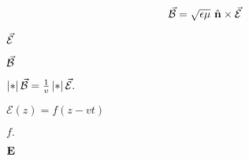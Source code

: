 \documentclass[10pt]{book}
\begin{document}
\begin{mdSnippets}
\begin{mdDisplaySnippet}%
\[%
\vBB = \sqrt{\epsilon\mu}\ \vn \times \vEE
\]%
\end{mdDisplaySnippet}%
\begin{mdInlineSnippet}%
$\vec{\mathcal{E}}$\end{mdInlineSnippet}%
\begin{mdInlineSnippet}[9753da3b8740fe5fb11142e0a6613de8]%
$\vec{\mathcal{B}}$\end{mdInlineSnippet}%
\begin{mdInlineSnippet}[b9ecba80b09dd2783868e27d65c93a93]%
$\left\vert *\right\vert{\vec{\mathcal{B}}} = \frac{1}{v} \left\vert *\right\vert{\vec{\mathcal{E}}}.$\end{mdInlineSnippet}%
\begin{mdInlineSnippet}[b31d5dc945d47925f07107d15157d14f]%
$\mathcal{E}(z) = f(z - vt)$\end{mdInlineSnippet}%
\begin{mdInlineSnippet}[e3cde3f61de01c172fa395c723c68d2f]%
$f.$\end{mdInlineSnippet}%
\begin{mdInlineSnippet}[3177c3b789270ed3013a4e6066f64dd6]%
$\vb{E}$\end{mdInlineSnippet}%

\end{mdSnippets}
\end{document}
